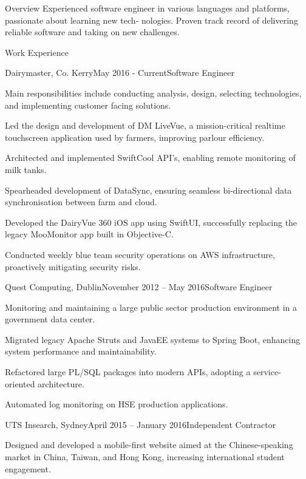 \documentclass{résumé}
\begin{document}
\begin{rSection}{Overview}
    Experienced software engineer in various languages and platforms, passionate about learning new tech- nologies. Proven track record of delivering reliable software and taking on new challenges.
\end{rSection}

\begin{rSection}{Work Experience}

\begin{rSubsection}{Dairymaster, Co. Kerry}{May 2016 - Current}{Software Engineer}{}
    \item Main responsibilities include conducting analysis, design, selecting technologies, and implementing customer facing solutions.
    \item Led the design and development of DM LiveVue, a mission-critical realtime touchscreen application used by farmers, improving parlour efficiency.
    \item Architected and implemented SwiftCool API's, enabling remote monitoring of milk tanks.
    \item Spearheaded development of DataSync, ensuring seamless bi-directional data synchronisation between farm and cloud.
    \item Developed the DairyVue 360 iOS app using SwiftUI, successfully replacing the legacy MooMonitor app built in Objective-C.
    \item Conducted weekly blue team security operations on AWS infrastructure, proactively mitigating security risks.
\end{rSubsection}

\begin{rSubsection}{Quest Computing, Dublin}{November 2012 – May 2016}{Software Engineer}{}
    \item Monitoring and maintaining a large public sector production environment in a government data center.
    \item Migrated legacy Apache Struts and JavaEE systems to Spring Boot, enhancing system performance and maintainability.
    \item Refactored large PL/SQL packages into modern APIs, adopting a service-oriented architecture.
    \item Automated log monitoring on HSE production applications.
\end{rSubsection}

\begin{rSubsection}{UTS Insearch, Sydney}{April 2015 – January 2016}{Independent Contractor}{}
    \item Designed and developed a mobile-first website aimed at the Chinese-speaking market in China, Taiwan, and Hong Kong, increasing international student engagement.
\end{rSubsection}


\end{rSection}
\end{document}
